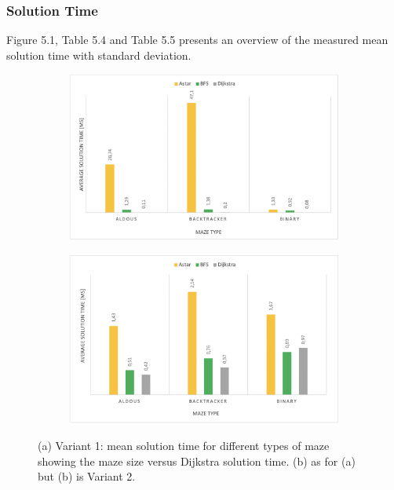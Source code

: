 \subsubsection{Solution Time}
Figure 5.1, Table 5.4 and Table 5.5 presents an overview of the measured mean solution time with standard deviation. 
\begin{figure}[!h]
    \centering
    \begin{subfigure}[b]{0.48\textwidth}
        \centering
        \includegraphics[width=\textwidth]{averagetime_variant1.png}
        \caption{}
    \end{subfigure}
    \begin{subfigure}[b]{0.48\textwidth}  
        \centering 
        \includegraphics[width=\textwidth]{averagetime_variant2.png}
        \caption{}
    \end{subfigure}
    \caption[]{(a) Variant 1: mean solution time for different types of maze showing the maze size versus Dijkstra solution time. (b) as for (a) but (b) is 
    Variant 2.}
\end{figure}
